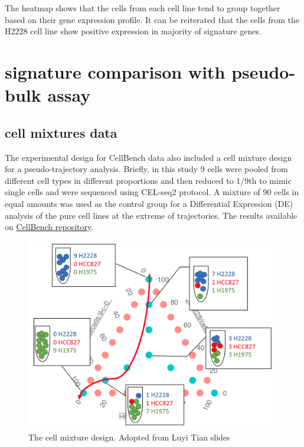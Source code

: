 \documentclass[]{book}
\theoremstyle{definition}
\theoremstyle{definition}
\theoremstyle{definition}
\theoremstyle{remark}
\begin{document}
The heatmap shows that the cells from each cell line tend to group
together based on their gene expression profile. It can be reiterated
that the cells from the H2228 cell line show positive expression in
majority of signature genes.

\hypertarget{signature-comparison-with-pseudo-bulk-assay}{%
\section{signature comparison with pseudo-bulk
assay}\label{signature-comparison-with-pseudo-bulk-assay}}

\hypertarget{cell-mixtures-data}{%
\subsection{cell mixtures data}\label{cell-mixtures-data}}

The experimental design for CellBench data also included a cell mixture
design for a pseudo-trajectory analysis. Briefly, in this study 9 cells
were pooled from different cell types in different proportions and then
reduced to 1/9th to mimic single cells and were sequenced using CEL-seq2
protocol. A mixture of 90 cells in equal amounts was used as the control
group for a Differential Expression (DE) analysis of the pure cell lines
at the extreme of trajectories. The results available on
\href{https://github.com/LuyiTian/CellBench_data/tree/master/data}{CellBench
repository}.

\begin{figure}[ht]

{\centering \includegraphics[width=0.7\linewidth]{figures/9cellmix} 

}

\caption{The cell mixture design. Adopted from Luyi Tian slides}\label{fig:unnamed-chunk-40}
\end{figure}
\end{document}
